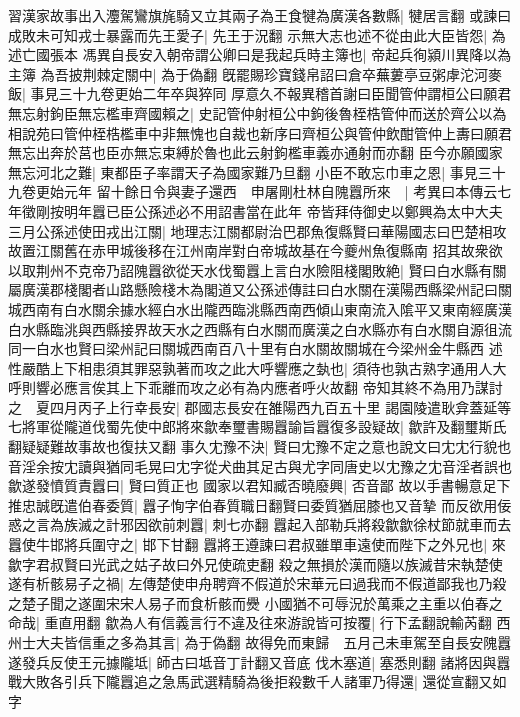 習漢家故事出入灋駕鸞旗旄騎又立其兩子為王食犍為廣漢各數縣|{
	犍居言翻}
或諫曰成敗未可知戎士暴露而先王愛子|{
	先王于況翻}
示無大志也述不從由此大臣皆怨|{
	為述亡國張本}
馮異自長安入朝帝謂公卿曰是我起兵時主簿也|{
	帝起兵徇潁川異降以為主簿}
為吾披荆棘定關中|{
	為于偽翻}
旣罷賜珍寶錢帛詔曰倉卒蕪蔞亭豆粥虖沱河麥飯|{
	事見三十九卷更始二年卒與猝同}
厚意久不報異稽首謝曰臣聞管仲謂桓公曰願君無忘射鉤臣無忘檻車齊國賴之|{
	史記管仲射桓公中鉤後魯桎梏管仲而送於齊公以為相說苑曰管仲桎梏檻車中非無愧也自裁也新序曰齊桓公與管仲飲酣管仲上夀曰願君無忘出奔於莒也臣亦無忘束縛於魯也此云射鉤檻車義亦通射而亦翻}
臣今亦願國家無忘河北之難|{
	東都臣子率謂天子為國家難乃旦翻}
小臣不敢忘巾車之恩|{
	事見三十九卷更始元年}
留十餘日令與妻子還西　申屠剛杜林自隗囂所來　|{
	考異曰本傳云七年徵剛按明年囂已臣公孫述必不用詔書當在此年}
帝皆拜侍御史以鄭興為太中大夫　三月公孫述使田戎出江關|{
	地理志江關都尉治巴郡魚復縣賢曰華陽國志曰巴楚相攻故置江關舊在赤甲城後移在江州南岸對白帝城故基在今夔州魚復縣南}
招其故衆欲以取荆州不克帝乃詔隗囂欲從天水伐蜀囂上言白水險阻棧閣敗絶|{
	賢曰白水縣有關屬廣漢郡棧閣者山路懸險棧木為閣道又公孫述傳註曰白水關在漢陽西縣梁州記曰關城西南有白水關余據水經白水出隴西臨洮縣西南西傾山東南流入隂平又東南經廣漢白水縣臨洮與西縣接界故天水之西縣有白水關而廣漢之白水縣亦有白水關自源徂流同一白水也賢曰梁州記曰關城西南百八十里有白水關故關城在今梁州金牛縣西}
述性嚴酷上下相患須其罪惡孰著而攻之此大呼響應之埶也|{
	須待也孰古熟字通用人大呼則響必應言俟其上下乖離而攻之必有為内應者呼火故翻}
帝知其終不為用乃謀討之　夏四月丙子上行幸長安|{
	郡國志長安在雒陽西九百五十里}
謁園陵遣耿弇蓋延等七將軍從隴道伐蜀先使中郎將來歙奉璽書賜囂諭旨囂復多設疑故|{
	歙許及翻璽斯氏翻疑疑難故事故也復扶又翻}
事久冘豫不決|{
	賢曰冘豫不定之意也說文曰冘冘行貌也音淫余按冘讀與猶同毛晃曰冘字從犬曲其足古與尤字同唐史以冘豫之冘音淫者誤也}
歙遂發憤質責囂曰|{
	賢曰質正也}
國家以君知臧否曉廢興|{
	否音鄙}
故以手書暢意足下推忠誠旣遣伯春委質|{
	囂子恂字伯春質職日翻賢曰委質猶屈膝也又音摯}
而反欲用佞惑之言為族滅之計邪因欲前刺囂|{
	刺七亦翻}
囂起入部勒兵將殺歙歙徐杖節就車而去囂使牛邯將兵圍守之|{
	邯下甘翻}
囂將王遵諫曰君叔雖單車遠使而陛下之外兄也|{
	來歙字君叔賢曰光武之姑子故曰外兄使疏吏翻}
殺之無損於漢而隨以族滅昔宋執楚使遂有析骸易子之禍|{
	左傳楚使申舟聘齊不假道於宋華元曰過我而不假道鄙我也乃殺之楚子聞之遂圍宋宋人易子而食析骸而㸑}
小國猶不可辱況於萬乘之主重以伯春之命哉|{
	重直用翻}
歙為人有信義言行不違及往來游說皆可按覆|{
	行下孟翻說輸芮翻}
西州士大夫皆信重之多為其言|{
	為于偽翻}
故得免而東歸　五月己未車駕至自長安隗囂遂發兵反使王元據隴坻|{
	師古曰坻音丁計翻又音底}
伐木塞道|{
	塞悉則翻}
諸將因與囂戰大敗各引兵下隴囂追之急馬武選精騎為後拒殺數千人諸軍乃得還|{
	還從宣翻又如字}
